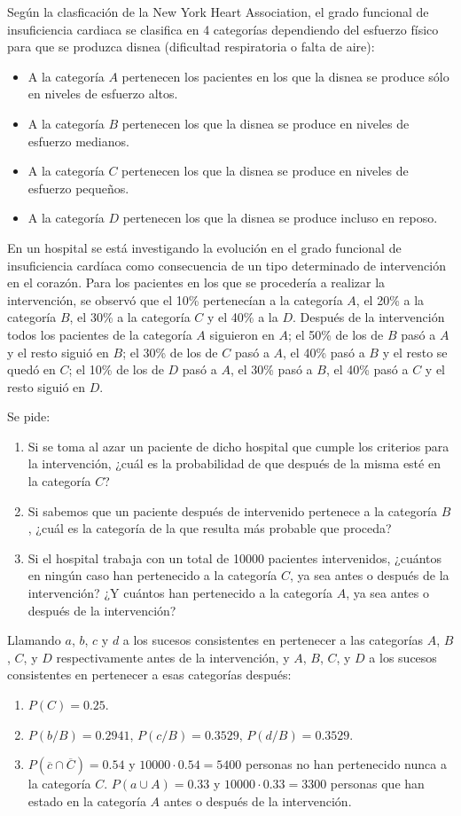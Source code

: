 {Según la clasficación de la New York Heart Association, el grado funcional de insuficiencia 
 cardiaca se clasifica en 4 categorías dependiendo del esfuerzo físico para que se produzca disnea (dificultad respiratoria o falta de aire):
\begin{itemize}
\item A la categoría $A$ pertenecen los pacientes en los que la disnea se produce sólo en niveles de esfuerzo altos.
\item A la categoría $B$ pertenecen los que la disnea se produce en niveles de esfuerzo medianos.
\item A la categoría $C$ pertenecen los que la disnea se produce en niveles de esfuerzo pequeños. 
\item A la categoría $D$ pertenecen los que la disnea se produce incluso en reposo.
\end{itemize}

En un hospital se está investigando la evolución en el grado funcional de insuficiencia cardíaca como consecuencia de un tipo determinado de
intervención en el corazón. Para los pacientes en los que se procedería a realizar la intervención, se observó que el 10\%  pertenecían a la
categoría $A$, el 20\% a la categoría $B$, el 30\% a la categoría $C$ y el 40\% a la $D$. Después de la intervención todos los pacientes de
la categoría $A$ siguieron en $A$; el 50\% de los de $B$ pasó a $A$ y el resto siguió en $B$; el 30\% de los de $C$ pasó a $A$, el 40\%
pasó a $B$ y el resto se quedó en $C$; el 10\% de los de $D$ pasó a $A$, el 30\% pasó a $B$, el 40\% pasó a $C$ y el resto siguió en $D$.

Se pide:
\begin{enumerate}
\item Si se toma al azar un paciente de dicho hospital que cumple los criterios para la intervención, ¿cuál es la probabilidad de que después de la misma esté en la categoría $C$?
\item Si sabemos que un paciente después de intervenido pertenece a la categoría $B$, ¿cuál es la categoría de la que resulta más probable que proceda?
\item Si el hospital trabaja con un total de 10000 pacientes intervenidos, ¿cuántos en ningún caso han pertenecido a la categoría $C$, ya sea antes o después de la intervención? ¿Y cuántos han pertenecido a la categoría $A$, ya sea antes o después de la intervención? 
\end{enumerate}
} 
{Llamando $a$, $b$, $c$ y $d$ a los sucesos consistentes en pertenecer a las categorías $A$, $B$, $C$, y $D$ respectivamente antes de la
intervención, y $A$, $B$, $C$, y $D$ a los sucesos consistentes en pertenecer a esas categorías después:
\begin{enumerate}
\item $P(C) = 0.25$.
\item $P(b/B) = 0.2941$, $P(c/B) = 0.3529$, $P(d/B) = 0.3529$.
\item $P(\overline c\cap \overline C)=0.54$ y $10000\cdot 0.54= 5400$ personas no han pertenecido nunca a la categoría $C$. $P(a\cup
A)=0.33$ y $10000\cdot 0.33=3300$ personas que han estado en la categoría $A$ antes o después de la intervención.
\end{enumerate}
}
